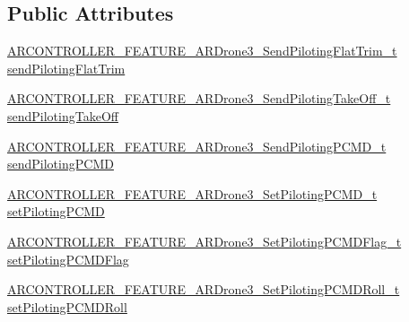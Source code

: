 \subsection*{Public Attributes}
\begin{DoxyCompactItemize}
\item 
\hyperlink{_a_r_c_o_n_t_r_o_l_l_e_r___feature_8h_af436e7b5c8f37b92681fc046b7e21de1}{A\+R\+C\+O\+N\+T\+R\+O\+L\+L\+E\+R\+\_\+\+F\+E\+A\+T\+U\+R\+E\+\_\+\+A\+R\+Drone3\+\_\+\+Send\+Piloting\+Flat\+Trim\+\_\+t} \hyperlink{struct_a_r_c_o_n_t_r_o_l_l_e_r___f_e_a_t_u_r_e___a_r_drone3__t_a669b42f84c5ca084102b7b0b310d3c5f}{send\+Piloting\+Flat\+Trim}
\item 
\hyperlink{_a_r_c_o_n_t_r_o_l_l_e_r___feature_8h_afcfdd2b7a1dd4f9eb7d19f5118ebd567}{A\+R\+C\+O\+N\+T\+R\+O\+L\+L\+E\+R\+\_\+\+F\+E\+A\+T\+U\+R\+E\+\_\+\+A\+R\+Drone3\+\_\+\+Send\+Piloting\+Take\+Off\+\_\+t} \hyperlink{struct_a_r_c_o_n_t_r_o_l_l_e_r___f_e_a_t_u_r_e___a_r_drone3__t_ab8442e7c7a8c62dce8a5c22980342cdf}{send\+Piloting\+Take\+Off}
\item 
\hyperlink{_a_r_c_o_n_t_r_o_l_l_e_r___feature_8h_aa6e73b444efa91c0677697bbc04248bc}{A\+R\+C\+O\+N\+T\+R\+O\+L\+L\+E\+R\+\_\+\+F\+E\+A\+T\+U\+R\+E\+\_\+\+A\+R\+Drone3\+\_\+\+Send\+Piloting\+P\+C\+M\+D\+\_\+t} \hyperlink{struct_a_r_c_o_n_t_r_o_l_l_e_r___f_e_a_t_u_r_e___a_r_drone3__t_a953ad72a588d22f6f688d419f6c122b7}{send\+Piloting\+P\+C\+MD}
\item 
\hyperlink{_a_r_c_o_n_t_r_o_l_l_e_r___feature_8h_afde47833b5387137e10604040211479a}{A\+R\+C\+O\+N\+T\+R\+O\+L\+L\+E\+R\+\_\+\+F\+E\+A\+T\+U\+R\+E\+\_\+\+A\+R\+Drone3\+\_\+\+Set\+Piloting\+P\+C\+M\+D\+\_\+t} \hyperlink{struct_a_r_c_o_n_t_r_o_l_l_e_r___f_e_a_t_u_r_e___a_r_drone3__t_aaa05fe41b7b9c5d8b434e42318b6c395}{set\+Piloting\+P\+C\+MD}
\item 
\hyperlink{_a_r_c_o_n_t_r_o_l_l_e_r___feature_8h_a1c01c45fe0e427366be102562fc31fe0}{A\+R\+C\+O\+N\+T\+R\+O\+L\+L\+E\+R\+\_\+\+F\+E\+A\+T\+U\+R\+E\+\_\+\+A\+R\+Drone3\+\_\+\+Set\+Piloting\+P\+C\+M\+D\+Flag\+\_\+t} \hyperlink{struct_a_r_c_o_n_t_r_o_l_l_e_r___f_e_a_t_u_r_e___a_r_drone3__t_a7af65cca8363d3b4dbeea56063631338}{set\+Piloting\+P\+C\+M\+D\+Flag}
\item 
\hyperlink{_a_r_c_o_n_t_r_o_l_l_e_r___feature_8h_a14e1b60ac6af7092921439b30cc7fe7a}{A\+R\+C\+O\+N\+T\+R\+O\+L\+L\+E\+R\+\_\+\+F\+E\+A\+T\+U\+R\+E\+\_\+\+A\+R\+Drone3\+\_\+\+Set\+Piloting\+P\+C\+M\+D\+Roll\+\_\+t} \hyperlink{struct_a_r_c_o_n_t_r_o_l_l_e_r___f_e_a_t_u_r_e___a_r_drone3__t_aba64da39b6cfbae42cf7d832688b8706}{set\+Piloting\+P\+C\+M\+D\+Roll}

\end{DoxyCompactItemize}
